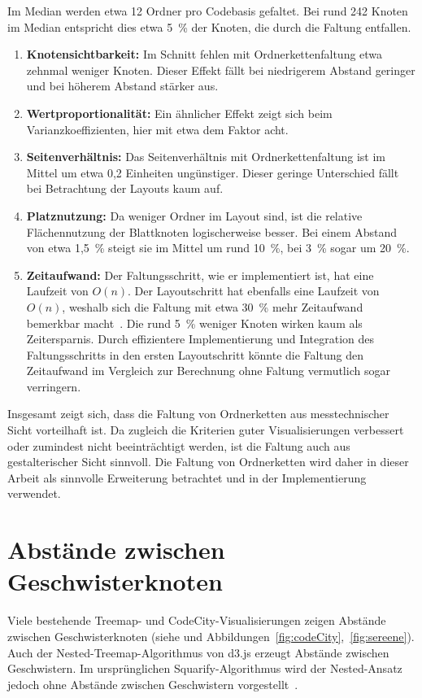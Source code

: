 Im Median werden etwa 12 Ordner pro Codebasis gefaltet. Bei rund 242 Knoten im Median entspricht dies etwa 5~\% der Knoten, die durch die Faltung entfallen.
\begin{enumerate}
    \item \textbf{Knotensichtbarkeit:} Im Schnitt fehlen mit Ordnerkettenfaltung etwa zehnmal weniger Knoten. Dieser Effekt fällt bei niedrigerem Abstand geringer und bei höherem Abstand stärker aus.
    \item \textbf{Wertproportionalität:} Ein ähnlicher Effekt zeigt sich beim Varianzkoeffizienten, hier mit etwa dem Faktor acht.
    \item \textbf{Seitenverhältnis:} Das Seitenverhältnis mit Ordnerkettenfaltung ist im Mittel um etwa 0{,}2 Einheiten ungünstiger. Dieser geringe Unterschied fällt bei Betrachtung der Layouts kaum auf.
    \item \textbf{Platznutzung:} Da weniger Ordner im Layout sind, ist die relative Flächennutzung der Blattknoten logischerweise besser. Bei einem Abstand von etwa 1{,}5~\% steigt sie im Mittel um rund 10~\%, bei 3~\% sogar um 20~\%.
    \item \textbf{Zeitaufwand:} Der Faltungsschritt, wie er implementiert ist, hat eine Laufzeit von $O(n)$. Der Layoutschritt hat ebenfalls eine Laufzeit von $O(n)$, weshalb sich die Faltung mit etwa 30~\% mehr Zeitaufwand bemerkbar macht~\cite{bruls2000squarified}. Die rund 5~\% weniger Knoten wirken kaum als Zeitersparnis. Durch effizientere Implementierung und Integration des Faltungsschritts in den ersten Layoutschritt könnte die Faltung den Zeitaufwand im Vergleich zur Berechnung ohne Faltung vermutlich sogar verringern.
\end{enumerate}
Insgesamt zeigt sich, dass die Faltung von Ordnerketten aus messtechnischer Sicht vorteilhaft ist. Da zugleich die Kriterien guter Visualisierungen verbessert oder zumindest nicht beeinträchtigt werden, ist die Faltung auch aus gestalterischer Sicht sinnvoll. Die Faltung von Ordnerketten wird daher in dieser Arbeit als sinnvolle Erweiterung betrachtet und in der Implementierung verwendet.


\section{Abstände zwischen Geschwisterknoten} \label{sec:AbständeGeschwister}

Viele bestehende Treemap- und CodeCity-Visualisierungen zeigen Abstände zwischen Geschwisterknoten (siehe \cite{codeCity1, code_charta_webdemo, sereene_website} und Abbildungen~\ref{fig:codeCity},~\ref{fig:sereene}). Auch der Nested-Treemap-Algorithmus von d3.js erzeugt Abstände zwischen Geschwistern. Im ursprünglichen Squarify-Algorithmus wird der Nested-Ansatz jedoch ohne Abstände zwischen Geschwistern vorgestellt~\cite{bruls2000squarified}.

